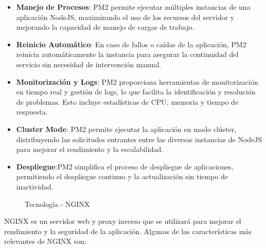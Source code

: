 \begin{itemize}

  \item \textbf{Manejo de Procesos}: PM2 permite ejecutar múltiples instancias de una aplicación NodeJS, maximizando el uso de los recursos del servidor y mejorando la capacidad de manejo de cargas de trabajo.
  
  \item \textbf{Reinicio Automático}: En caso de fallos o caídas de la aplicación, PM2 reinicia automáticamente la instancia para asegurar la continuidad del servicio sin necesidad de intervención manual.
  
  \item \textbf{Monitorización y Logs}: PM2 proporciona herramientas de monitorización en tiempo real y gestión de logs, lo que facilita la identificación y resolución de problemas. Esto incluye estadísticas de CPU, memoria y tiempo de respuesta.
  
  \item \textbf{Cluster Mode}: PM2 permite ejecutar la aplicación en modo clúster, distribuyendo las solicitudes entrantes entre las diversas instancias de NodeJS para mejorar el rendimiento y la escalabilidad.
  
  \item \textbf{Despliegue}:PM2 simplifica el proceso de despliegue de aplicaciones, permitiendo el despliegue continuo y la actualización sin tiempo de inactividad.

\end{itemize}

\newpage
\begin{figure}[h]
   \caption{Tecnología - NGINX}
\end{figure}
  
NGINX es un servidor web y proxy inverso que se utilizará para mejorar el rendimiento y la seguridad de la aplicación. Algunas de las características más relevantes de NGINX son:

